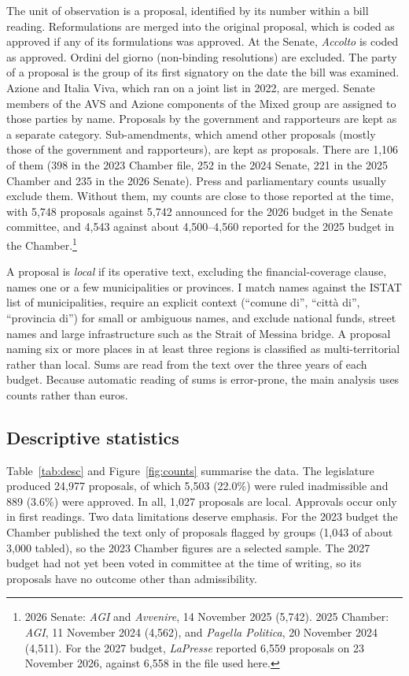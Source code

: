 \documentclass[12pt]{article}
\begin{document}
The unit of observation is a proposal, identified by its number within a bill reading. Reformulations are merged into the original proposal, which is coded as approved if any of its formulations was approved. At the Senate, \emph{Accolto} is coded as approved. Ordini del giorno (non-binding resolutions) are excluded. The party of a proposal is the group of its first signatory on the date the bill was examined. Azione and Italia Viva, which ran on a joint list in 2022, are merged. Senate members of the AVS and Azione components of the Mixed group are assigned to those parties by name. Proposals by the government and rapporteurs are kept as a separate category. Sub-amendments, which amend other proposals (mostly those of the government and rapporteurs), are kept as proposals. There are 1,106 of them (398 in the 2023 Chamber file, 252 in the 2024 Senate, 221 in the 2025 Chamber and 235 in the 2026 Senate). Press and parliamentary counts usually exclude them. Without them, my counts are close to those reported at the time, with 5,748 proposals against 5,742 announced for the 2026 budget in the Senate committee, and 4,543 against about 4,500--4,560 reported for the 2025 budget in the Chamber.\footnote{2026 Senate: \emph{AGI} and \emph{Avvenire}, 14 November 2025 (5,742). 2025 Chamber: \emph{AGI}, 11 November 2024 (4,562), and \emph{Pagella Politica}, 20 November 2024 (4,511). For the 2027 budget, \emph{LaPresse} reported 6,559 proposals on 23 November 2026, against 6,558 in the file used here.}

A proposal is \emph{local} if its operative text, excluding the financial-coverage clause, names one or a few municipalities or provinces. I match names against the ISTAT list of municipalities, require an explicit context (``comune di'', ``città di'', ``provincia di'') for small or ambiguous names, and exclude national funds, street names and large infrastructure such as the Strait of Messina bridge. A proposal naming six or more places in at least three regions is classified as multi-territorial rather than local. Sums are read from the text over the three years of each budget. Because automatic reading of sums is error-prone, the main analysis uses counts rather than euros.

\subsection{Descriptive statistics}

Table~\ref{tab:desc} and Figure~\ref{fig:counts} summarise the data. The legislature produced 24,977 proposals, of which 5,503 (22.0\%) were ruled inadmissible and 889 (3.6\%) were approved. In all, 1,027 proposals are local. Approvals occur only in first readings. Two data limitations deserve emphasis. For the 2023 budget the Chamber published the text only of proposals flagged by groups (1,043 of about 3,000 tabled), so the 2023 Chamber figures are a selected sample. The 2027 budget had not yet been voted in committee at the time of writing, so its proposals have no outcome other than admissibility.
\end{document}
